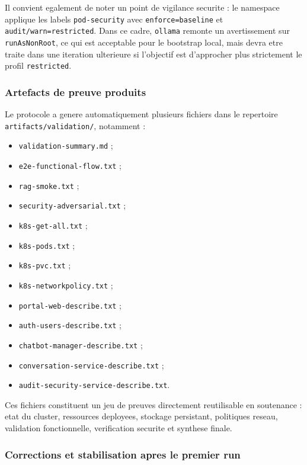 Il convient egalement de noter un point de vigilance securite : le namespace applique les labels \texttt{pod-security} avec \texttt{enforce=baseline} et \texttt{audit/warn=restricted}. Dans ce cadre, \texttt{ollama} remonte un avertissement sur \texttt{runAsNonRoot}, ce qui est acceptable pour le bootstrap local, mais devra etre traite dans une iteration ulterieure si l'objectif est d'approcher plus strictement le profil \texttt{restricted}.

\subsubsection{Artefacts de preuve produits}

Le protocole a genere automatiquement plusieurs fichiers dans le repertoire \texttt{artifacts/validation/}, notamment :

\begin{itemize}
  \item \texttt{validation-summary.md} ;
  \item \texttt{e2e-functional-flow.txt} ;
  \item \texttt{rag-smoke.txt} ;
  \item \texttt{security-adversarial.txt} ;
  \item \texttt{k8s-get-all.txt} ;
  \item \texttt{k8s-pods.txt} ;
  \item \texttt{k8s-pvc.txt} ;
  \item \texttt{k8s-networkpolicy.txt} ;
  \item \texttt{portal-web-describe.txt} ;
  \item \texttt{auth-users-describe.txt} ;
  \item \texttt{chatbot-manager-describe.txt} ;
  \item \texttt{conversation-service-describe.txt} ;
  \item \texttt{audit-security-service-describe.txt}.
\end{itemize}

Ces fichiers constituent un jeu de preuves directement reutilisable en soutenance : etat du cluster, ressources deployees, stockage persistant, politiques reseau, validation fonctionnelle, verification securite et synthese finale.

\subsubsection{Corrections et stabilisation apres le premier run}

